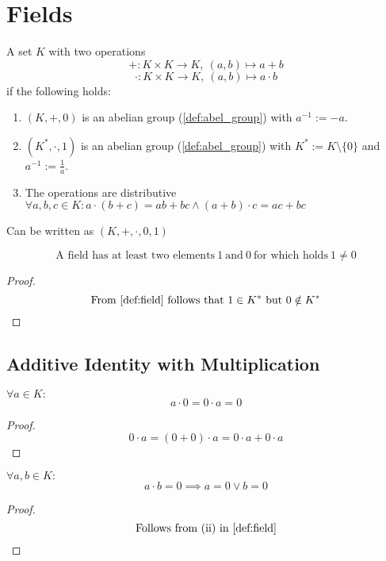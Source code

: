 \section{Fields}
\begin{definition}[Field]\label{def:field}
   A set \(K\) with two operations
   \[+: K \times K \to K,~(a, b) \mapsto a + b\]
   \[\cdot: K \times K \to K,~(a, b) \mapsto a \cdot b\]
   if the following holds:
   \begin{enumerate}[label=(\roman*)]
      \item \((K, +, 0)\) is an abelian group (\ref{def:abel_group}) with \(a^{-1} := -a\).
      \item \((K^{*}, \cdot, 1)\) is an abelian group (\ref{def:abel_group}) with \(K^{*} := K \setminus \{0\}\) and \(a^{-1} := \frac{1}{a}\).
      \item The operations are distributive \(\forall a, b, c \in K: a \cdot (b + c) = ab + bc \land (a + b) \cdot c = ac + bc\)
   \end{enumerate}
   Can be written as \((K, +, \cdot, 0, 1)\)
\end{definition}

\begin{proposition}
   \[\text{A field has at least two elements}~1~\text{and}~0~\text{for which holds}~1 \neq 0\]
\end{proposition}
\begin{proof}
   \[\text{From \cref{def:field} follows that}~1 \in K^{*}~\text{but}~0 \notin K^{*}\]
\end{proof}

\subsection{Additive Identity with Multiplication}
\begin{proposition}[\(0 \cdot a = 0\)]
   \(\forall a \in K:\)
   \[a \cdot 0 = 0 \cdot a = 0\]
\end{proposition}
\begin{proof}
   \[0 \cdot a = (0 + 0) \cdot a = 0 \cdot a + 0 \cdot a\]
\end{proof}

\begin{proposition}[\(a \cdot b = 0\)]
   \(\forall a, b \in K:\)
   \[a \cdot b = 0 \implies a = 0 \lor b = 0\]
\end{proposition}
\begin{proof}
   \[\text{Follows from (ii) in \cref{def:field}}\]
\end{proof}

